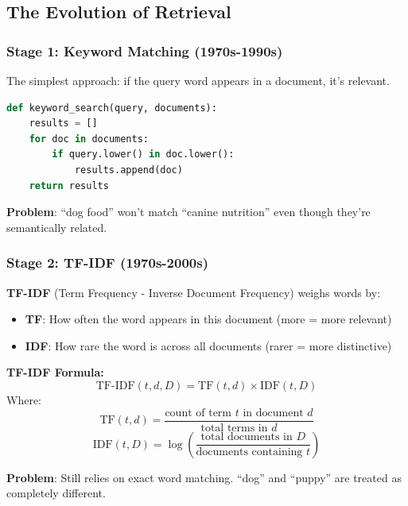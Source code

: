 \documentclass[12pt,a4paper]{article}
\begin{document}
\subsection{The Evolution of Retrieval}

\subsubsection{Stage 1: Keyword Matching (1970s-1990s)}

The simplest approach: if the query word appears in a document, it's relevant.

\begin{lstlisting}[language=Python,caption={Naive keyword matching}]
def keyword_search(query, documents):
    results = []
    for doc in documents:
        if query.lower() in doc.lower():
            results.append(doc)
    return results
\end{lstlisting}

\textbf{Problem}: ``dog food'' won't match ``canine nutrition'' even though they're semantically related.

\subsubsection{Stage 2: TF-IDF (1970s-2000s)}

\begin{concept}
\textbf{TF-IDF} (Term Frequency - Inverse Document Frequency) weighs words by:
\begin{itemize}
    \item \textbf{TF}: How often the word appears in this document (more = more relevant)
    \item \textbf{IDF}: How rare the word is across all documents (rarer = more distinctive)
\end{itemize}
\end{concept}

\begin{mathbox}
\textbf{TF-IDF Formula:}
\[
\text{TF-IDF}(t, d, D) = \text{TF}(t, d) \times \text{IDF}(t, D)
\]
Where:
\[
\text{TF}(t, d) = \frac{\text{count of term } t \text{ in document } d}{\text{total terms in } d}
\]
\[
\text{IDF}(t, D) = \log\left(\frac{\text{total documents in } D}{\text{documents containing } t}\right)
\]
\end{mathbox}

\textbf{Problem}: Still relies on exact word matching. ``dog'' and ``puppy'' are treated as completely different.
\end{document}
